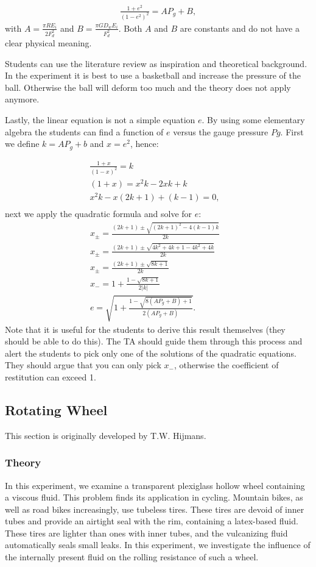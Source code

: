 \documentclass{article}
\begin{document}
\begin{align}
    \frac{1+e^2}{(1-e^2)^2}  = A P_g + B,
\end{align}
with $A = \frac{\pi R E_i}{2F_d^2}$ and $B = \frac{\pi GD_wE_i}{F_d^2}$. Both $A$ and $B$ are constants and do not have a clear physical meaning.

Students can use the literature review as inspiration and theoretical background. In the experiment it is best to use a basketball and increase the pressure of the ball. Otherwise the ball will deform too much and the theory does not apply anymore.

Lastly, the linear equation is not a simple equation $e$. By using some elementary algebra the students can find a function of $e$ versus the gauge pressure $Pg$. First we define $k = A P_g + b$ and $x=e^2$, hence:

\begin{align}
    \frac{1+x}{(1-x)^2} = k & \\
    (1+x) = x^2 k - 2xk +k & \\
    x^2 k - x(2k+1) + (k-1) = 0, & \\
\end{align}
next we apply the quadratic formula and solve for $e$:
\begin{align}
    x_{\pm}  = \frac{(2k + 1) \pm \sqrt{(2k+1)^2 - 4(k-1)k}}{2k} & \\
    x_{\pm}  = \frac{(2k+1) \pm \sqrt{4k^2 +4k + 1 -4k^2+4k}}{2k} & \\
    x_{\pm}  = \frac{(2k+1) \pm \sqrt{8k + 1}}{2k} & \\ 
    x_{-}  = 1+ \frac{1-\sqrt{8k + 1}}{2|k|}& \\ 
    e = \sqrt{1+ \frac{1-\sqrt{8(AP_g+B) + 1}}{2(AP_g+B)}}.
\end{align}
Note that it is useful for the students to derive this result themselves (they should be able to do this). The TA should guide them through this process and alert the students to pick only one of the solutions of the quadratic equations. They should argue that you can only pick $x_{-}$, otherwise the coefficient of restitution can exceed 1.
\newpage


\subsection{Rotating Wheel}
This section is originally developed by T.W. Hijmans.
\subsubsection{Theory}
In this experiment, we examine a transparent plexiglass hollow wheel containing a viscous fluid. This problem finds its application in cycling. Mountain bikes, as well as road bikes increasingly, use tubeless tires. These tires are devoid of inner tubes and provide an airtight seal with the rim, containing a latex-based fluid. These tires are lighter than ones with inner tubes, and the vulcanizing fluid automatically seals small leaks. In this experiment, we investigate the influence of the internally present fluid on the rolling resistance of such a wheel.
\end{document}
